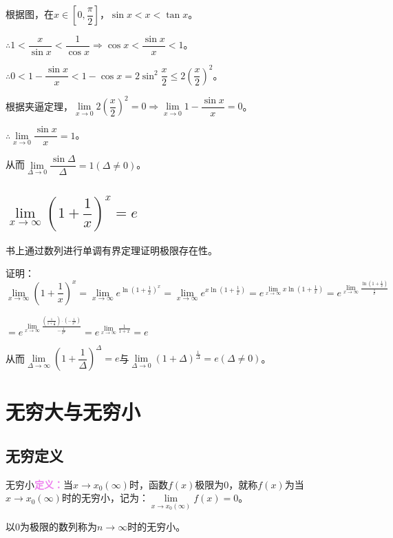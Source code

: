 \documentclass[UTF8, 12pt]{ctexart}
\begin{document}
根据图，在$x\in[0,\dfrac{\pi}{2}]$，$\sin x<x<\tan x$。

$\therefore 1<\dfrac{x}{\sin x}<\dfrac{1}{\cos x}\Rightarrow\cos x<\dfrac{\sin x}{x}<1$。

$\therefore 0<1-\dfrac{\sin x}{x}<1-\cos x=2\sin^2\dfrac{x}{2}\leqslant 2\left(\dfrac{x}{2}\right)^2$。

根据夹逼定理，$\lim\limits_{x\to 0}2\left(\dfrac{x}{2}\right)^2=0\Rightarrow\lim\limits_{x\to 0}1-\dfrac{\sin x}{x}=0$。

$\therefore\lim\limits_{x\to 0}\dfrac{\sin x}{x}=1$。

从而$\lim\limits_{\Delta\to 0}\dfrac{\sin\Delta}{\Delta}=1(\Delta\neq 0)$。

\subsection{\texorpdfstring{$\lim\limits_{x\to\infty}\left(1+\dfrac{1}{x}\right)^x=e$}{}}

书上通过数列进行单调有界定理证明极限存在性。

证明：$\lim\limits_{x\to\infty}\left(1+\dfrac{1}{x}\right)^x=\lim\limits_{x\to\infty}e^{\ln(1+\frac{1}{x})^x}=\lim\limits_{x\to\infty}e^{x\ln(1+\frac{1}{x})}=e^{\lim\limits_{x\to\infty}x\ln(1+\frac{1}{x})}=e^{\lim\limits_{x\to\infty}\frac{\ln(1+\frac{1}{x})}{\frac{1}{x}}}$

$=e^{\lim\limits_{x\to\infty}\frac{\left(\frac{1}{1+\frac{1}{x}}\right)\cdot\left(-\frac{1}{x^2}\right)}{-\frac{1}{x^2}}}=e^{\lim\limits_{x\to\infty}\frac{1}{1+x}}=e$\medskip

从而$\lim\limits_{\Delta\to\infty}\left(1+\dfrac{1}{\Delta}\right)^\Delta=e$与$\lim\limits_{\Delta\to 0}\left(1+\Delta\right)^{\frac{1}{\Delta}}=e(\Delta\neq 0)$。

\section{无穷大与无穷小}

\subsection{无穷定义}

无穷小\textcolor{violet}{\textbf{定义：}}当$x\to x_0(\infty)$时，函数$f(x)$极限为0，就称$f(x)$为当$x\to x_0(\infty)$时的无穷小，记为：$\lim\limits_{x\to x_0(\infty)}f(x)=0$。

以0为极限的数列称为$n\to\infty$时的无穷小。
\end{document}
